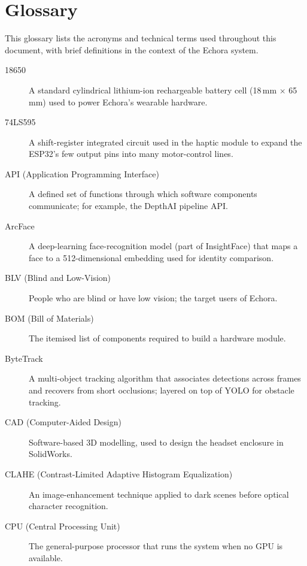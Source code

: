 \chapter{Glossary}

This glossary lists the acronyms and technical terms used throughout this document, with brief definitions in the context of the Echora system.

\begin{description}

  \item[18650] A standard cylindrical lithium-ion rechargeable battery cell (18\,mm $\times$ 65\,mm) used to power Echora's wearable hardware.

  \item[74LS595] A shift-register integrated circuit used in the haptic module to expand the ESP32's few output pins into many motor-control lines.

  \item[API (Application Programming Interface)] A defined set of functions through which software components communicate; for example, the DepthAI pipeline API.

  \item[ArcFace] A deep-learning face-recognition model (part of InsightFace) that maps a face to a 512-dimensional embedding used for identity comparison.

  \item[BLV (Blind and Low-Vision)] People who are blind or have low vision; the target users of Echora.

  \item[BOM (Bill of Materials)] The itemised list of components required to build a hardware module.

  \item[ByteTrack] A multi-object tracking algorithm that associates detections across frames and recovers from short occlusions; layered on top of YOLO for obstacle tracking.

  \item[CAD (Computer-Aided Design)] Software-based 3D modelling, used to design the headset enclosure in SolidWorks.

  \item[CLAHE (Contrast-Limited Adaptive Histogram Equalization)] An image-enhancement technique applied to dark scenes before optical character recognition.

  \item[CPU (Central Processing Unit)] The general-purpose processor that runs the system when no GPU is available.


\end{description}

